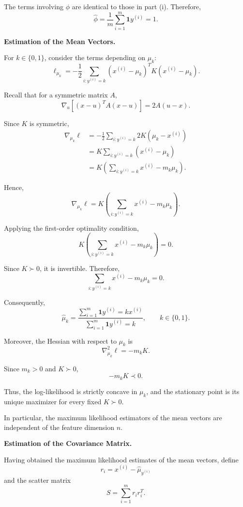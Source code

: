 \documentclass[10pt]{article}
\newcommand{\ind}{\mathbf{1}}
\begin{document}
\begin{enumerate}
\begin{enumerate}[label=(\alph*)]
The terms involving $\phi$ are identical
to those in part (i). Therefore,
\[
\boxed{
\hat{\phi}
=
\frac{1}{m}
\sum_{i=1}^{m}
\ind{y^{(i)}=1}.
}
\]

\medskip
\noindent\colorbox{blue!20}{\textbf{Estimation of the Mean Vectors.}}

For $k\in\{0,1\}$, consider the terms
depending on $\mu_k$:
\[
\ell_{\mu_k}
=
-\frac{1}{2}
\sum_{i:y^{(i)}=k}
(x^{(i)}-\mu_k)^T
K
(x^{(i)}-\mu_k).
\]

Recall that for a symmetric matrix $A$,
\[
\nabla_u
\left[
(x-u)^TA(x-u)
\right]
=
2A(u-x).
\]

Since $K$ is symmetric,
\[
\begin{aligned}
\nabla_{\mu_k}\ell
&=
-\frac{1}{2}
\sum_{i:y^{(i)}=k}
2K(\mu_k-x^{(i)})
\\[4pt]
&=
K
\sum_{i:y^{(i)}=k}
(x^{(i)}-\mu_k)
\\[4pt]
&=
K
\left(
\sum_{i:y^{(i)}=k}x^{(i)}
-
m_k\mu_k
\right).
\end{aligned}
\]

Hence,
\[
\boxed{
\nabla_{\mu_k}\ell
=
K
\left(
\sum_{i:y^{(i)}=k}x^{(i)}
-
m_k\mu_k
\right).
}
\]

Applying the first-order optimality condition,
\[
K
\left(
\sum_{i:y^{(i)}=k}x^{(i)}
-
m_k\mu_k
\right)
=0.
\]

Since $K\succ0$, it is invertible.
Therefore,
\[
\sum_{i:y^{(i)}=k}x^{(i)}
-
m_k\mu_k
=0.
\]

Consequently,
\[
\boxed{
\hat{\mu}_k
=
\frac{
\sum_{i=1}^{m}
\ind{y^{(i)}=k}x^{(i)}
}{
\sum_{i=1}^{m}
\ind{y^{(i)}=k}
},
\qquad k\in\{0,1\}.
}
\]

Moreover, the Hessian with respect
to $\mu_k$ is
\[
\boxed{
\nabla_{\mu_k}^{2}\ell
=
-m_kK.
}
\]

Since $m_k>0$ and $K\succ0$,
\[
-m_kK\prec0.
\]

Thus, the log-likelihood is strictly concave
in $\mu_k$, and the stationary point is its
unique maximizer for every fixed $K\succ0$.

In particular, the maximum likelihood
estimators of the mean vectors are
independent of the feature dimension $n$.

\medskip
\noindent\colorbox{blue!20}{\textbf{Estimation of the Covariance Matrix.}}

Having obtained the maximum likelihood
estimates of the mean vectors, define
\[
r_i
=
x^{(i)}-\hat{\mu}_{y^{(i)}}
\]
and the scatter matrix
\[
\boxed{
S
=
\sum_{i=1}^{m}r_ir_i^T.
}
\]


\end{enumerate}
\end{enumerate}
\end{document}
